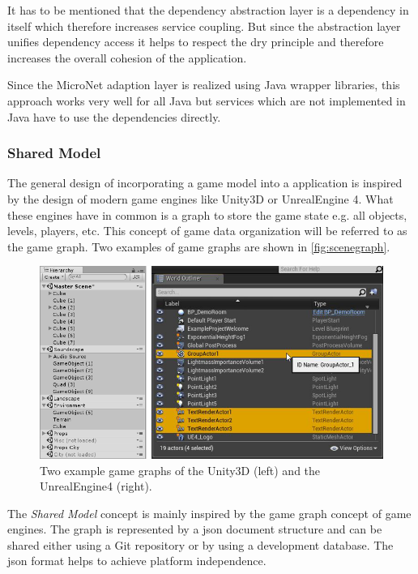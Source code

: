 It has to be mentioned that the dependency abstraction layer is a dependency in
itself which therefore increases service coupling. But since the abstraction
layer unifies dependency access it helps to respect the \gls{dry}
principle and therefore increases the overall cohesion of the application. 

Since the MicroNet adaption layer is realized using Java wrapper libraries,
this approach works very well for all Java \mss{} but services which are not
implemented in Java have to use the dependencies directly.

\subsubsection{Shared Model}
\label{subsub:shared_model}

The general design of incorporating a game model into a \mn{} application is
inspired by the design of modern game engines like Unity3D or UnrealEngine 4.
What these engines have in common is a graph to store the game state e.g. all
objects, levels, players, etc. This concept of game data organization will be
referred to as the game graph. Two examples of game graphs are shown in
\autoref{fig:scenegraph}.

\begin{figure}
  \centering
  \includegraphics[width=\textwidth]{images/game_engine/scenegraph}
  \caption{Two example game graphs of the Unity3D (left) and the UnrealEngine4
  (right).}
  \label{fig:scenegraph}
\end{figure}

The \textit{Shared Model} concept is mainly inspired by the game graph concept
of game engines. The graph is represented by a \gls{json} document structure and
can be shared either using a Git repository or by using a development database.
The \gls{json} format helps to achieve platform independence.

